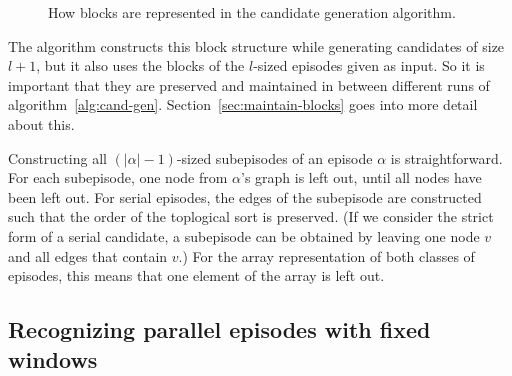 \begin{figure}
\centering
{}
\label{fig:block-values}
\caption{How blocks are represented in the candidate generation algorithm.}
\end{figure}

The algorithm constructs this block structure while generating candidates of size $ l + 1 $, but it also uses the blocks of the $ l $-sized episodes given as input. So it is important that they are preserved and maintained in between different runs of algorithm~\ref{alg:cand-gen}. Section~\ref{sec:maintain-blocks} goes into more detail about this.

Constructing all $ (| \alpha | - 1) $-sized subepisodes of an episode $ \alpha $ is straightforward. For each subepisode, one node from $ \alpha $'s graph is left out, until all nodes have been left out. For serial episodes, the edges of the subepisode are constructed such that the order of the toplogical sort is preserved. (If we consider the strict form of a serial candidate, a subepisode can be obtained by leaving one node $ v $ and all edges that contain $ v $.) For the array representation of both classes of episodes, this means that one element of the array is left out.


\subsection{Recognizing parallel episodes with fixed windows}


